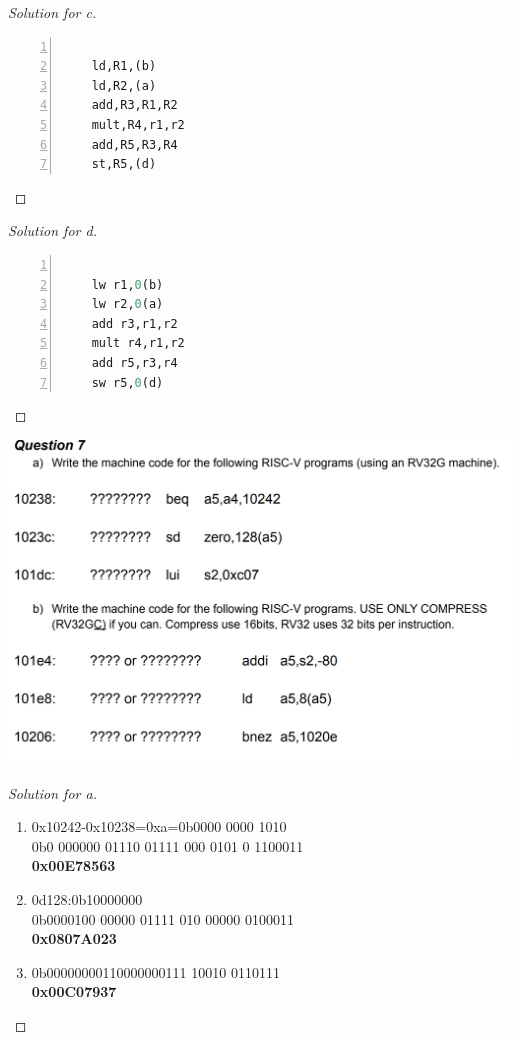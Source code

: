 \documentclass[12pt]{article}
\begin{document}
\begin{proof}[Solution for c]
	\begin{lstlisting}[language={python},numbers=left,numberstyle=\tiny,%frame=shadowbox,  
		rulesepcolor=\color{red!20!green!20!blue!20},  
		keywordstyle=\color{blue!70!black},  
		commentstyle=\color{blue!90!},  
		basicstyle=\ttfamily]  
		
	ld,R1,(b)
	ld,R2,(a)
	add,R3,R1,R2
	mult,R4,r1,r2
	add,R5,R3,R4
	st,R5,(d)
	\end{lstlisting}
\end{proof}
\begin{proof}[Solution for d]
	\begin{lstlisting}[language={python},numbers=left,numberstyle=\tiny,%frame=shadowbox,  
		rulesepcolor=\color{red!20!green!20!blue!20},  
		keywordstyle=\color{blue!70!black},  
		commentstyle=\color{blue!90!},  
		basicstyle=\ttfamily]  
		
	lw r1,0(b)
	lw r2,0(a)
	add r3,r1,r2
	mult r4,r1,r2
	add r5,r3,r4
	sw r5,0(d)
	\end{lstlisting}
\end{proof}
\includegraphics[scale=0.3]{7.png}
\begin{proof}[Solution for a]
	\ \\
	\begin{enumerate}
		\item 0x10242-0x10238=0xa=0b0000 0000 1010\\
		0b0 000000 01110 01111 000 0101 0 1100011\\
		\textbf{0x00E78563}
		\item 0d128:0b10000000\\
		0b0000100 00000 01111 010 00000 0100011\\
		\textbf{0x0807A023}
		\item 0b00000000110000000111 10010 0110111\\
		\textbf{0x00C07937}
	\end{enumerate}
\end{proof}
\end{document}
